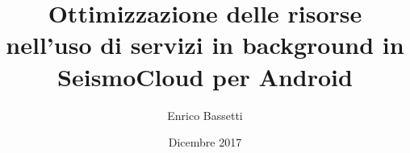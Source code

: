 \documentclass[compress]{beamer}
\author{Enrico Bassetti}
\title{Ottimizzazione delle risorse nell'uso di servizi in background in SeismoCloud per Android}
\institute{Dipartimento di Informatica\\Università La Sapienza - Roma}
\date{Dicembre 2017}
\begin{document}
\begin{frame}[t,plain]
\titlepage

\vspace{15px}

\end{frame}


\end{document}

